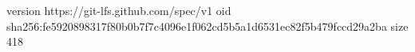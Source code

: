 version https://git-lfs.github.com/spec/v1
oid sha256:fe5920898317f80b0b7f7c4096e1f062cd5b5a1d6531ec82f5b479fccd29a2ba
size 418
